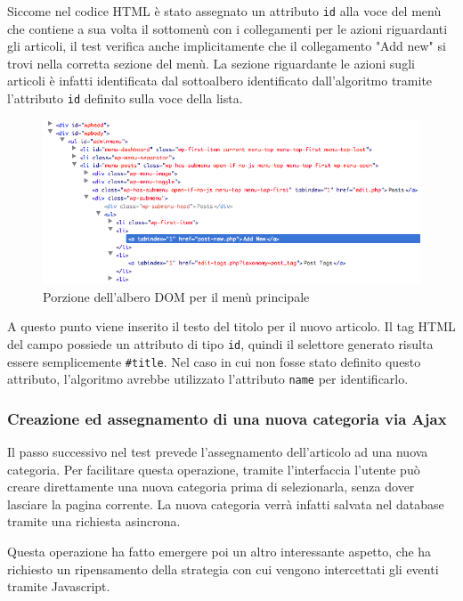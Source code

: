 \documentclass[12pt]{toptesi}
\begin{document}
Siccome nel codice HTML è stato assegnato un attributo \verb|id| alla voce del menù che contiene a sua volta il sottomenù con i collegamenti per le azioni riguardanti gli articoli, il test verifica anche implicitamente che il collegamento "Add new" si trovi nella corretta sezione del menù. La sezione riguardante le azioni sugli articoli è infatti identificata dal sottoalbero identificato dall'algoritmo tramite l'attributo \verb|id| definito sulla voce della lista.

\begin{figure}[htbp]
\begin{center}
\includegraphics[width=\textwidth]{images/wp_tour/8_add_new_firebug.png}
\caption{Porzione dell'albero DOM per il menù principale}
\label{fig:addNewDOM}
\end{center}
\end{figure}

A questo punto viene inserito il testo del titolo per il nuovo articolo. Il tag HTML del campo possiede un attributo di tipo \verb|id|, quindi il selettore generato risulta essere semplicemente \verb|#title|. Nel caso in cui non fosse stato definito questo attributo, l'algoritmo avrebbe utilizzato l'attributo \verb|name| per identificarlo.

\subsubsection{Creazione ed assegnamento di una nuova categoria via Ajax}

Il passo successivo nel test prevede l'assegnamento dell'articolo ad una nuova categoria. Per facilitare questa operazione, tramite l'interfaccia l'utente può creare direttamente una nuova categoria prima di selezionarla, senza dover lasciare la pagina corrente. La nuova categoria verrà infatti salvata nel database tramite una richiesta asincrona.

Questa operazione ha fatto emergere poi un altro interessante aspetto, che ha richiesto un ripensamento della strategia con cui vengono intercettati gli eventi tramite Javascript.
\end{document}
